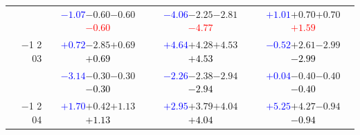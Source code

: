 \documentclass[compress]{beamer}
\begin{document}
\begin{frame}
\begin{tabular}{r | c | c | c}
          & \textcolor{blue}{$-1.07$}\hspace{0.1 cm}$-0.60$\hspace{0.1 cm}$-0.60$\hspace{0.1 cm}\textcolor{red}{$-0.60$} & \textcolor{blue}{$-4.06$}\hspace{0.1 cm}$-2.25$\hspace{0.1 cm}$-2.81$\hspace{0.1 cm}\textcolor{red}{$-4.77$} & \textcolor{blue}{$+1.01$}\hspace{0.1 cm}$+0.70$\hspace{0.1 cm}$+0.70$\hspace{0.1 cm}\textcolor{red}{$+1.59$} \\
$-$1 2 03 & \textcolor{blue}{$+0.72$}\hspace{0.1 cm}$-2.85$\hspace{0.1 cm}$+0.69$\hspace{0.1 cm}\textcolor{black}{$+0.69$} & \textcolor{blue}{$+4.64$}\hspace{0.1 cm}$+4.28$\hspace{0.1 cm}$+4.53$\hspace{0.1 cm}\textcolor{black}{$+4.53$} & \textcolor{blue}{$-0.52$}\hspace{0.1 cm}$+2.61$\hspace{0.1 cm}$-2.99$\hspace{0.1 cm}\textcolor{black}{$-2.99$} \\
          & \textcolor{blue}{$-3.14$}\hspace{0.1 cm}$-0.30$\hspace{0.1 cm}$-0.30$\hspace{0.1 cm}\textcolor{black}{$-0.30$} & \textcolor{blue}{$-2.26$}\hspace{0.1 cm}$-2.38$\hspace{0.1 cm}$-2.94$\hspace{0.1 cm}\textcolor{black}{$-2.94$} & \textcolor{blue}{$+0.04$}\hspace{0.1 cm}$-0.40$\hspace{0.1 cm}$-0.40$\hspace{0.1 cm}\textcolor{black}{$-0.40$} \\
$-$1 2 04 & \textcolor{blue}{$+1.70$}\hspace{0.1 cm}$+0.42$\hspace{0.1 cm}$+1.13$\hspace{0.1 cm}\textcolor{black}{$+1.13$} & \textcolor{blue}{$+2.95$}\hspace{0.1 cm}$+3.79$\hspace{0.1 cm}$+4.04$\hspace{0.1 cm}\textcolor{black}{$+4.04$} & \textcolor{blue}{$+5.25$}\hspace{0.1 cm}$+4.27$\hspace{0.1 cm}$-0.94$\hspace{0.1 cm}\textcolor{black}{$-0.94$} \\

\end{tabular}
\end{frame}
\end{document}
